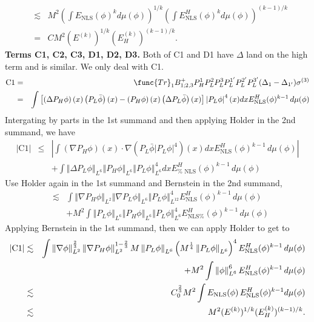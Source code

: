 \documentclass[12pt,letterpaper,leqno]{amsart}
\theoremstyle{plain}
\numberwithin{equation}{section}
\numberwithin{theorem}{section}
\numberwithin{proposition}{section}
\numberwithin{lemma}{section}
\numberwithin{corollary}{section}
\begin{document}
\begin{eqnarray*}
&\lesssim &M^{2}\left( \int E_{\text{NLS}}(\phi )^{k}d\mu (\phi )\right)
^{1/k}\left( \int E_{\text{NLS}}^{H}(\phi )^{k}d\mu (\phi )\right) ^{(k-1)/k}
\\
&=&CM^{2}(E^{(k)})^{1/k}(E_{H}^{(k)})^{(k-1)/k}.
\end{eqnarray*}%
\textbf{Terms C1, C2, C3, D1, D2, D3. }Both of C1 and D1 have $\Delta $ land
on the high term and is similar. We only deal with C1. 
\begin{eqnarray*}
\text{C1} &=&\func{Tr}_{1}B_{1;2,3}^{+}P_{H}^{1}P_{L}^{2}P_{L}^{3}P_{L}^{1^{%
\prime }}P_{L}^{2^{\prime }}P_{L}^{3^{\prime }}(\Delta _{1}-\Delta
_{1^{\prime }})\sigma ^{(3)} \\
&=&\int \left[ \left( \Delta P_{H}\phi \right) (x)\left( P_{L}\bar{\phi}%
\right) (x)-\left( P_{H}\phi \right) (x)\left( \Delta P_{L}\bar{\phi}\right)
(x)\right] \left\vert P_{L}\phi \right\vert ^{4}(x)dxE_{\text{NLS}}^{H}(\phi
)^{k-1}\,d\mu (\phi )
\end{eqnarray*}%
Intergating by parts in the 1st summand and then applying Holder in the 2nd
summand, we have 
\begin{eqnarray*}
\left\vert \text{C1}\right\vert &\leqslant &\left\vert \int \left( \nabla
P_{H}\phi \right) (x)\cdot \nabla \left( P_{L}\bar{\phi}\left\vert P_{L}\phi
\right\vert ^{4}\right) (x)dxE_{\text{NLS}}^{H}(\phi )^{k-1}\,d\mu (\phi
)\right\vert \\
&&+\int \left\Vert \Delta P_{L}\phi \right\Vert _{L^{6}}\left\Vert P_{H}\phi
\right\Vert _{L^{6}}\left\Vert P_{L}\phi \right\Vert _{L^{6}}^{4}dxE_{\text{%
NLS}}^{H}(\phi )^{k-1}\,d\mu (\phi )
\end{eqnarray*}%
Use Holder again in the 1st summand and Bernstein in the 2nd summand, 
\begin{eqnarray*}
&\lesssim &\int \left\Vert \nabla P_{H}\phi \right\Vert _{L^{2}}\left\Vert
\nabla P_{L}\phi \right\Vert _{L^{6}}\left\Vert P_{L}\phi \right\Vert
_{L^{12}}^{4}E_{\text{NLS}}^{H}(\phi )^{k-1}\,d\mu (\phi ) \\
&&+M^{2}\int \left\Vert P_{L}\phi \right\Vert _{L^{6}}\left\Vert P_{H}\phi
\right\Vert _{L^{6}}\left\Vert P_{L}\phi \right\Vert _{L^{6}}^{4}E_{\text{NLS%
}}^{H}(\phi )^{k-1}\,d\mu (\phi )
\end{eqnarray*}%
Applying Bernstein in the 1st summand, then we can apply Holder to get to%
\begin{eqnarray*}
\left\vert \text{C1}\right\vert &\lesssim &\int \left\Vert \nabla \phi
\right\Vert _{L^{2}}^{\frac{2}{3}}\left\Vert \nabla P_{H}\phi \right\Vert
_{L^{2}}^{1-\frac{2}{3}}M\left\Vert P_{L}\phi \right\Vert _{L^{6}}\left( M^{%
\frac{1}{4}}\left\Vert P_{L}\phi \right\Vert _{L^{6}}\right) ^{4}E_{\text{NLS%
}}^{H}(\phi )^{k-1}\,d\mu (\phi ) \\
&&+M^{2}\int \left\Vert \phi \right\Vert _{L^{6}}^{6}E_{\text{NLS}}^{H}(\phi
)^{k-1}\,d\mu (\phi ) \\
&\lesssim &C_{0}^{\frac{2}{3}}M^{2}\int E_{\text{NLS}}(\phi )\,E_{\text{NLS}%
}^{H}(\phi )^{k-1}d\mu (\phi ) \\
&\lesssim &M^{2}(E^{(k)})^{1/k}(E_{H}^{(k)})^{(k-1)/k}.
\end{eqnarray*}%
\end{document}
